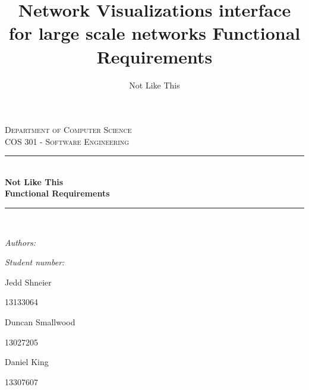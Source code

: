 \documentclass[a4paper,12pt]{report}
\author{Not Like This}
\title{ Network Visualizations interface for large scale networks Functional Requirements}
\newcommand{\HRule}{\rule{\linewidth}{0.5mm}}
\begin{document}
\setlength{\parskip}{6pt}

\begin{titlepage}

\begin{center}
\textsc{\LARGE Department of Computer Science}\\[1.5cm]
\textsc{\Large COS 301 - Software Engineering}\\[0.5cm]
\HRule \\[0.4cm]

{ \huge \bfseries Not Like This}
\\[0.4cm] 
{ \huge \bfseries Functional Requirements}\\[0.4cm]
\HRule \\[0.4cm]
\begin{minipage}{0.4\textwidth}
\begin{flushleft} \large
\emph{Authors:}
\end{flushleft}
\end{minipage}
\begin{minipage}{0.4\textwidth}
\begin{flushright} \large
\emph{Student number:}
\end{flushright}
\end{minipage}

\begin{minipage}{0.4\textwidth}
\begin{flushleft} \large
Jedd {Shneier}
\end{flushleft}
\end{minipage}
\begin{minipage}{0.4\textwidth}
\begin{flushright} \large
\emph{}
13133064
\end{flushright}
\end{minipage}

\begin{minipage}{0.4\textwidth}
\begin{flushleft} \large
Duncan {Smallwood}
\end{flushleft}
\end{minipage}
\begin{minipage}{0.4\textwidth}
\begin{flushright} \large
\emph{}
13027205
\end{flushright}
\end{minipage}

\begin{minipage}{0.4\textwidth}
\begin{flushleft} \large
Daniel {King}
\end{flushleft}
\end{minipage}
\begin{minipage}{0.4\textwidth}
\begin{flushright} \large
\emph{}
13307607
\end{flushright}
\end{minipage}


\end{center}
\end{titlepage}
\end{document}
